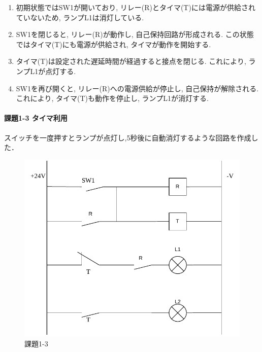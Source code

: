 \begin{enumerate}
  \item 初期状態ではSW1が開いており, リレー(R)とタイマ(T)には電源が供給されていないため, ランプL1は消灯している.
  \item SW1を閉じると, リレー(R)が動作し, 自己保持回路が形成される. この状態ではタイマ(T)にも電源が供給され, タイマが動作を開始する.
  \item タイマ(T)は設定された遅延時間が経過すると接点を閉じる. これにより, ランプL1が点灯する.
  \item SW1を再び開くと, リレー(R)への電源供給が停止し, 自己保持が解除される. これにより, タイマ(T)も動作を停止し, ランプL1が消灯する.
\end{enumerate}

\paragraph{課題1-3 タイマ利用}
スイッチを一度押すとランプが点灯し,5秒後に自動消灯するような回路を作成した．
\begin{figure}[H]
  \centering
  \includegraphics[scale=0.5]{sozai/16.pdf}
  \caption{課題1-3}
\end{figure}

